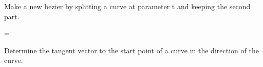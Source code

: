 \documentclass{article}
\begin{document}
\begin{Maple Normal}{
\begin{Maple Normal}{
}\end{Maple Normal}
}\end{Maple Normal}
\begin{Maple Normal}{
\begin{Maple Normal}{
Make a new bezier by splitting a curve at parameter t and keeping the second part.}\end{Maple Normal}

}\end{Maple Normal}

\begin{Maple Normal}{
\begin{Maple Normal}{
}\end{Maple Normal}
}\end{Maple Normal}
\begin{Maple Normal}{
\begin{Maple Normal}{
=
}\end{Maple Normal}

}\end{Maple Normal}

\begin{Maple Normal}{
\begin{Maple Normal}{
}\end{Maple Normal}
}\end{Maple Normal}
\begin{Maple Normal}{
\begin{Maple Normal}{
Determine the tangent vector to the start point of a curve in the direction of the curve.}\end{Maple Normal}

}\end{Maple Normal}
\end{document}
